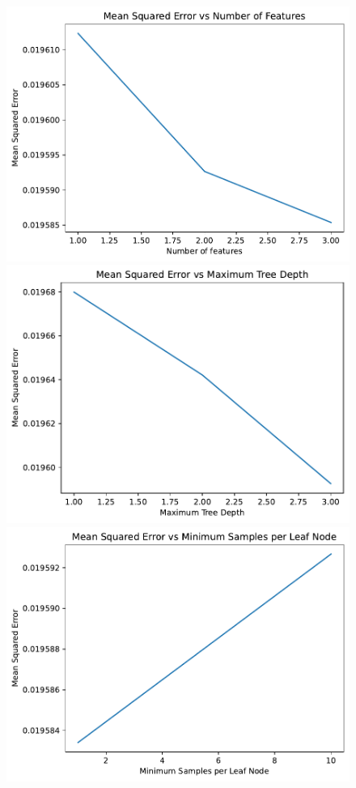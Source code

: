 \documentclass[hidelinks,12pt]{article}
\begin{document}
\subsection{}
\begin{figure}[htbp]
    \centering
    \includegraphics[width=.75\textwidth]{out/2_3_1.pdf}
    \includegraphics[width=.75\textwidth]{out/2_3_2.pdf}
    \includegraphics[width=.75\textwidth]{out/2_3_3.pdf}
\end{figure}
\end{document}
